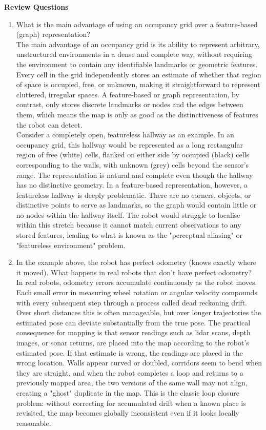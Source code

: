 \documentclass[11 pt , a 4 paper ]{article}
\theoremstyle{definition}
\begin{document}
  \textbf{Review Questions}
  \begin{enumerate}
    \item What is the main advantage of using an occupancy grid over a feature-based (graph) representation?\\
    \newline \noindent The main advantage of an occupancy grid is its ability to represent arbitrary, unstructured environments in a dense and complete way, without requiring the environment to contain any identifiable landmarks or geometric features. Every cell in the grid independently stores an estimate of whether that region of space is occupied, free, or unknown, making it straightforward to represent cluttered, irregular spaces. A feature-based or graph representation, by contrast, only stores discrete landmarks or nodes and the edges between them, which means the map is only as good as the distinctiveness of features the robot can detect.\\ 
\newline \noindent Consider a completely open, featureless hallway as an example. In an occupancy grid, this hallway would be represented as a long rectangular region of free (white) cells, flanked on either side by occupied (black) cells corresponding to the walls, with unknown (grey) cells beyond the sensor's range. The representation is natural and complete even though the hallway has no distinctive geometry. In a feature-based representation, however, a featureless hallway is deeply problematic. There are no corners, objects, or distinctive points to serve as landmarks, so the graph would contain little or no nodes within the hallway itself. The robot would struggle to localise within this stretch because it cannot match current observations to any stored features, leading to what is known as the "perceptual aliasing" or "featureless environment" problem.
    \item In the example above, the robot has perfect odometry (knows exactly where it moved). What happens in real robots that don't have perfect odometry?\\
     \newline \noindent In real robots, odometry errors accumulate continuously as the robot moves. Each small error in measuring wheel rotation or angular velocity compounds with every subsequent step through a process called dead reckoning drift. Over short distances this is often manageable, but over longer trajectories the estimated pose can deviate substantially from the true pose. The practical consequence for mapping is that sensor readings such as lidar scans, depth images, or sonar returns, are placed into the map according to the robot's estimated pose. If that estimate is wrong, the readings are placed in the wrong location. Walls appear curved or doubled, corridors seem to bend when they are straight, and when the robot completes a loop and returns to a previously mapped area, the two versions of the same wall may not align, creating a "ghost" duplicate in the map. This is the classic loop closure problem: without correcting for accumulated drift when a known place is revisited, the map becomes globally inconsistent even if it looks locally reasonable.

\end{enumerate}
\end{document}
